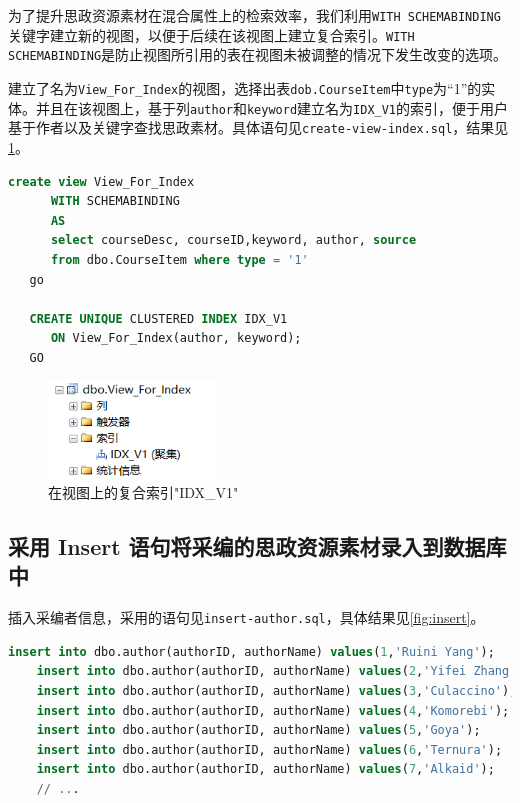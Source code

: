 \documentclass[11pt]{article}
\begin{document}
  为了提升思政资源素材在混合属性上的检索效率，我们利用\verb|WITH SCHEMABINDING|关键字建立新的视图，以便于后续在该视图上建立复合索引。\verb|WITH SCHEMABINDING|是防止视图所引用的表在视图未被调整的情况下发生改变的选项。

  建立了名为\verb|View_For_Index|的视图，选择出表\verb|dob.CourseItem|中\verb|type|为“1”的实体。并且在该视图上，基于列\verb|author|和\verb|keyword|建立名为\verb|IDX_V1|的索引，便于用户基于作者以及关键字查找思政素材。具体语句见\verb|create-view-index.sql|，结果见\ref{fig:IDX1}。

  \begin{file}
    \begin{lstlisting}[language=sql]
      create view View_For_Index
      WITH SCHEMABINDING
      AS
      select courseDesc, courseID,keyword, author, source 
      from dbo.CourseItem where type = '1'
   go
   
   CREATE UNIQUE CLUSTERED INDEX IDX_V1
      ON View_For_Index(author, keyword);
   GO
    \end{lstlisting}
  \end{file}

  \begin{figure}[h]
    \centering
    \includegraphics[width=0.4\textwidth]{IDX1.png}
    \caption{在视图上的复合索引"IDX\_V1"}
    \label{fig:IDX1}
  \end{figure}

  \subsection{采用 Insert 语句将采编的思政资源素材录入到数据库中}
  插入采编者信息，采用的语句见\verb|insert-author.sql|，具体结果见\ref{fig:insert}。

  \begin{file}
    \begin{lstlisting}[language=sql]
    insert into dbo.author(authorID, authorName) values(1,'Ruini Yang');
    insert into dbo.author(authorID, authorName) values(2,'Yifei Zhang');
    insert into dbo.author(authorID, authorName) values(3,'Culaccino');
    insert into dbo.author(authorID, authorName) values(4,'Komorebi');
    insert into dbo.author(authorID, authorName) values(5,'Goya');
    insert into dbo.author(authorID, authorName) values(6,'Ternura');
    insert into dbo.author(authorID, authorName) values(7,'Alkaid');
    // ...
    \end{lstlisting}
  \end{file}
\end{document}
